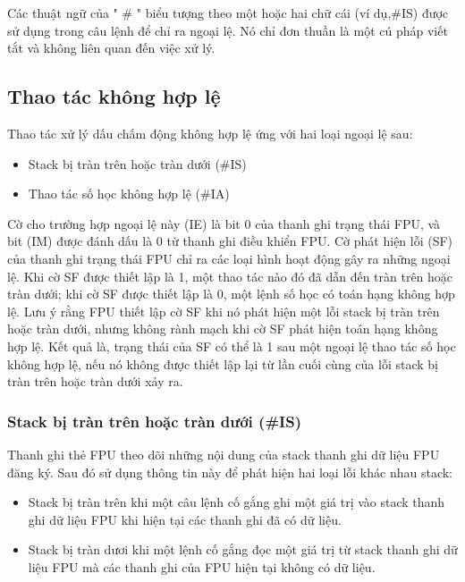 Các thuật ngữ của " \# " biểu tượng theo một hoặc hai chữ cái (ví dụ,\#IS) được sử dụng trong câu lệnh để chỉ ra ngoại lệ. Nó chỉ đơn thuần là một cú pháp viết tắt và không liên quan đến việc xử lý.

		\subsection*{Thao tác không hợp lệ}
		Thao tác xử lý dấu chấm động không hợp lệ ứng với hai loại ngoại lệ sau:
		\begin{itemize}
				\renewcommand{\labelitemi}{\textbullet}
				\item Stack bị tràn trên hoặc tràn dưới (\#IS)
					\item Thao tác số học không hợp lệ (\#IA)
		\end{itemize}
		
		Cờ cho trường hợp ngoại lệ này (IE) là bit 0 của thanh ghi trạng thái FPU, và bit (IM) được đánh dấu là 0 từ thanh ghi điều khiển FPU. Cờ phát hiện lỗi (SF) của thanh ghi trạng thái FPU chỉ ra các loại hình hoạt động gây ra những ngoại lệ. Khi cờ SF được thiết lập là 1, một thao tác nào đó đã dẫn đến tràn trên hoặc tràn dưới; khi cờ SF được thiết lập là 0, một lệnh số học có toán hạng không hợp lệ. Lưu ý rằng FPU thiết lập cờ SF khi nó phát hiện một lỗi stack bị tràn trên hoặc tràn dưới, nhưng không rành mạch khi cờ SF phát hiện toán hạng không hợp lệ. Kết quả là, trạng thái của SF có thể là 1 sau một ngoại lệ thao tác số học không hợp lệ, nếu nó không được thiết lập lại từ lần cuối cùng của lỗi stack bị tràn trên hoặc tràn dưới xảy ra.
		
	\subsubsection*{	Stack bị tràn trên hoặc tràn dưới (\#IS)}
		Thanh ghi thẻ FPU theo dõi những nội dung của stack thanh ghi dữ liệu FPU đăng ký. Sau đó sử dụng thông tin này để phát hiện hai loại lỗi khác nhau stack:
		\begin{itemize}
			\renewcommand{\labelitemi}{\textbullet}
			\item Stack bị tràn trên khi một câu lệnh cố gắng ghi một giá trị vào stack thanh ghi dữ liệu FPU khi hiện tại các thanh ghi đã có dữ liệu.
			\item Stack bị tràn dươi khi một lệnh cố gắng đọc một giá trị từ stack thanh ghi dữ liệu FPU mà các thanh ghi của FPU hiện tại không có dữ liệu.
		\end{itemize} 	
	 
